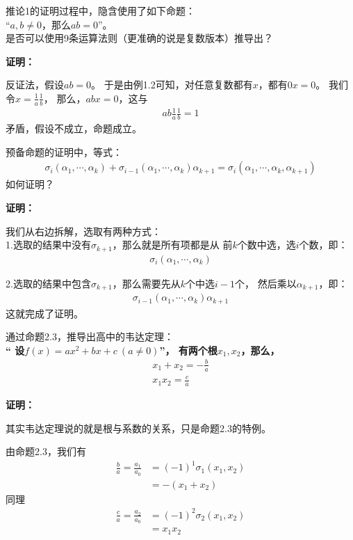 \documentclass{article}
\begin{document}
\begin{zremark}
      推论1的证明过程中，隐含使用了如下命题：\\
      “$a, b \neq 0$，那么$ab = 0$”。\\
      是否可以使用9条运算法则（更准确的说是复数版本）推导出？
\end{zremark}

\textbf{证明：}

反证法，假设$ab = 0$。
于是由例1.2可知，对任意复数都有$x$，都有$0 x = 0$。
我们令$x = \frac{1}{a} \frac{1}{b}$，
那么，$ab x = 0$，这与
\begin{align*}
      ab \frac{1}{a} \frac{1}{b} = 1
\end{align*}
矛盾，假设不成立，命题成立。

\begin{zremark}
      预备命题的证明中，等式：
      \begin{align*}
            \sigma_i(\alpha_1,\cdots,\alpha_k)
            +
            \sigma_{i - 1}(\alpha_1, \cdots, \alpha_k)\alpha_{k + 1}
            =
            \sigma_i(\alpha_1, \cdots, \alpha_k, \alpha_{k + 1})
      \end{align*}
      如何证明？
\end{zremark}

\textbf{证明：}

我们从右边拆解，选取有两种方式：\\
1.选取的结果中没有$\sigma_{k + 1}$，那么就是所有项都是从
前$k$个数中选，选$i$个数，即：
\begin{align*}
      \sigma_{i}(\alpha_1,\cdots,\alpha_k)
\end{align*}

2.选取的结果中包含$\sigma_{k + 1}$，那么需要先从$k$个中选$i - 1$个，
然后乘以$\alpha_{k + 1}$，即：
\begin{align*}
      \sigma_{i - 1}(\alpha_1, \cdots, \alpha_k)\alpha_{k + 1}
\end{align*}
这就完成了证明。

\begin{zremark}
      通过命题2.3，推导出高中的韦达定理：\\
      \textbf{“
            设$f(x) = ax^2 + bx + c \ (a \neq 0)$”，
            有两个根$x_1, x_2$，那么，
            \begin{align*}
                  x_1 + x_2 = - \frac{b}{a} \\
                  x_1 x_2 = \frac{c}{a}
            \end{align*}
      }
\end{zremark}

\textbf{证明：}

其实韦达定理说的就是根与系数的关系，只是命题2.3的特例。

由命题2.3，我们有
\begin{align*}
      \frac{b}{a} = \frac{a_1}{a_0} & = (-1)^1 \sigma_1(x_1, x_2) \\
                                    & = - (x_1 + x_2)
\end{align*}
同理
\begin{align*}
      \frac{c}{a} = \frac{a_2}{a_0} & = (-1)^2 \sigma_2(x_1, x_2) \\
                                    & = x_1x_2
\end{align*}
\end{document}
